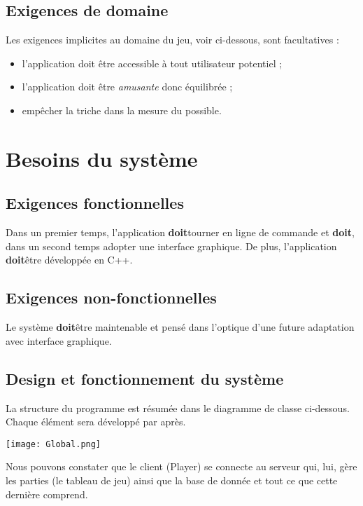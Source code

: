 \documentclass[12pt]{article}
\let\simplesection\section
\renewcommand{\section}{\clearpage\simplesection}
\let\simplesubsection\subsection
\renewcommand{\subsection}{
	\needspace{0.5\pagetotal}
	\simplesubsection
}
\newcommand{\doit}{\textbf{doit}}
\begin{document}
	\subsection{Exigences de domaine}
		Les exigences implicites au domaine du jeu, voir ci-dessous, sont facultatives :

		\begin{itemize}
			\item l'application doit être accessible à tout utilisateur potentiel ;
			\item l'application doit être \textit{amusante} donc équilibrée ;
			\item empêcher la triche dans la mesure du possible.
		\end{itemize}



\section{Besoins du système}
	\subsection{Exigences fonctionnelles}
		Dans un premier temps, l'application \doit tourner en ligne de commande et \doit, dans un second temps adopter une interface
		graphique.
		De plus, l'application \doit être développée en C++.

	\subsection{Exigences non-fonctionnelles}
		Le système \doit être maintenable et pensé dans l'optique d'une future adaptation avec interface graphique.

	\subsection{Design et fonctionnement du système}
		La structure du programme est résumée dans le diagramme de classe ci-dessous. Chaque élément sera développé par après.
		\begin{center}\texttt{[image: Global.png]}\end{center}

		Nous pouvons constater que le client (Player) se connecte au serveur qui, lui, gère les parties (le tableau de jeu) ainsi que la base de donnée et tout ce que cette dernière comprend.
\end{document}
